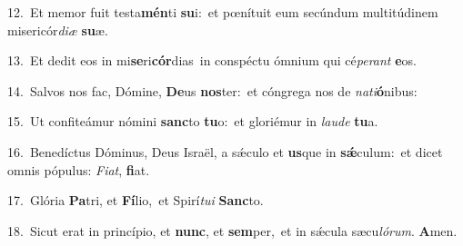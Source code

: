 {\numbfont\textcolor{\numbcolor}{12.}}~Et memor fuit testa\-\textbf{mén}\-ti \textbf{su}\-i:~\star et pœnítuit eum secúndum multitúdinem misericór\-\textit{di}\-\textit{æ} \textbf{su}\-æ.\par
{\numbfont\textcolor{\numbcolor}{13.}}~Et dedit eos in mi\-\textbf{se}\-ri\-\textbf{cór}\-dias~\star in conspéctu ómnium qui cé\-\textit{pe}\-\textit{rant} \textbf{e}\-os.\par
{\numbfont\textcolor{\numbcolor}{14.}}~Salvos nos fac, Dómine, \textbf{De}\-us \textbf{nos}\-ter:~\star et cóngrega nos de \textit{na}\-\textit{ti}\textbf{ó}nibus:\par
{\numbfont\textcolor{\numbcolor}{15.}}~Ut confiteámur nómini \textbf{sanc}\-to \textbf{tu}\-o:~\star et gloriémur in \textit{lau}\-\textit{de} \textbf{tu}\-a.\par
{\numbfont\textcolor{\numbcolor}{16.}}~Benedíctus Dóminus, Deus Israël, a sǽculo et \textbf{us}\-que in \textbf{sǽ}\-culum:~\star et dicet omnis pópulus: \textit{Fi}\-\textit{at}, \textbf{fi}\-at.\par
{\numbfont\textcolor{\numbcolor}{17.}}~Glória \textbf{Pa}\-tri, et \textbf{Fí}\-lio,~\star et Spirí\-\textit{tu}\-\textit{i} \textbf{Sanc}\-to.\par
{\numbfont\textcolor{\numbcolor}{18.}}~Sicut erat in princípio, et \textbf{nunc}\-, et \textbf{sem}\-per,~\star et in sǽcula sæcu\-\textit{ló}\-\textit{rum}. \textbf{A}\-men.\par
